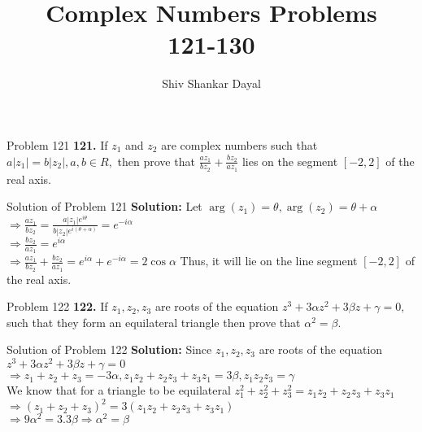 \documentclass[aspectratio=169,8pt]{beamer}
\title{Complex Numbers Problems\\ 121-130}
\author[Shiv Shankar Dayal]{Shiv Shankar Dayal}
\begin{document}
\begin{frame}
  \titlepage
\end{frame}
\begin{frame}{Problem 121}
  \textbf{121.} If $z_1$ and $z_2$ are complex numbers such that $a|z_1| = b|z_2|, a, b\in R,$ then prove that $\frac{az_1}{bz_2} +
  \frac{bz_2}{az_1}$ lies on the segment $[-2, 2]$ of the real axis.
\end{frame}
\begin{frame}{Solution of Problem 121}
  \textbf{Solution:} Let $\arg(z_1) = \theta, \arg(z_2) = \theta + \alpha$\\
  \vspace*{0.2cm}
  $\Rightarrow \frac{az_1}{bz_2} = \frac{a|z_1|e^{i\theta}}{b|z_2|e^{i(\theta + \alpha)}} = e^{-i\alpha}$\\
  \vspace*{0.2cm}
  $\Rightarrow \frac{bz_2}{az_1} = e^{i\alpha}$\\
  \vspace*{0.2cm}
  $\Rightarrow \frac{az_1}{bz_2} + \frac{bz_2}{az_1} = e^{i\alpha} + e^{-i\alpha} = 2\cos\alpha$
  \vspace*{0.2cm}
  Thus, it will lie on the line segment $[-2, 2]$ of the real axis.
\end{frame}
\begin{frame}{Problem 122}
  \textbf{122.} If $z_1, z_2, z_3$ are roots of the equation $z^3 + 3\alpha z^2 + 3\beta z + \gamma = 0,$ such that they form an
  equilateral triangle then prove that $\alpha^2 = \beta.$
\end{frame}
\begin{frame}{Solution of Problem 122}
  \textbf{Solution:} Since $z_1, z_2, z_3$ are roots of the equation $z^3 + 3\alpha z^2 + 3\beta z + \gamma = 0$\\
  \vspace*{0.2cm}
  $\Rightarrow z_1 + z_2 + z_3 = -3\alpha, z_1z_2 + z_2z_3 + z_3z_1 = 3\beta, z_1z_2z_3 = \gamma$\\
  \vspace*{0.2cm}
  We know that for a triangle to be equilateral
  $z_1^2 + z_2^2 + z_3^2 = z_1z_2 + z_2z_3 + z_3z_1$\\
  \vspace*{0.2cm}
  $\Rightarrow (z_1 + z_2 + z_3)^2 = 3(z_1z_2 + z_2z_3 + z_3z_1)$\\
  \vspace*{0.2cm}
  $\Rightarrow 9\alpha^2 = 3.3\beta \Rightarrow \alpha^2 = \beta$
\end{frame}
\end{document}
